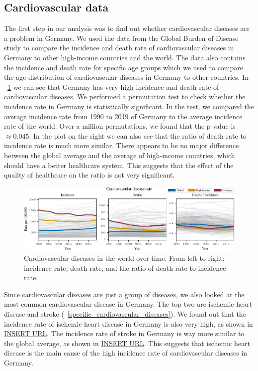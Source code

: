 \subsection{Cardiovascular data}\label{sec:cardiovascular_data}
The first step in our analysis was to find out whether cardiovascular diseases are a problem in Germany. We used the data from the Global Burden of Disease study \citep{GBD2019}
to compare the incidence and death rate of cardiovascular diseases in Germany to other high-income countries and the world. The data also contains 
the incidence and death rate for specific age groups which we used to compare the age distribution of cardiovascular diseases in Germany to other countries.
In \figurename~\ref{Cardiovascular diseases over time} we can see that Germany has very high incidence and death rate of cardiovascular diseases. We performed a
permutation test to check whether the incidence rate in Germany is statistically significant. In the test, we compared the average incidence rate from 1990 to 2019
of Germany to the average incidence rate of the world. Over a million permutations, we found that the p-value is $\approx 0.045$. 
In the plot on the right we can also see that the ratio of death rate to incidence rate is much more similar. There appears to be no major difference between the global average and the average of 
high-income countries, which should have a better healthcare system. This suggests that the effect of the quality of healthcare on the ratio is not very significant.

\begin{figure}[h]
    \vskip 0.2in
    \centering
    \centerline{\includegraphics[]{fig/fig_cardiovascular_disease_rate.pdf}}
    \caption{Cardiovascular diseases in the world over time. From left to right: incidence rate, death rate, 
    and the ratio of death rate to incidence rate.}
    \label{Cardiovascular diseases over time}
\end{figure}

Since cardiovascular diseases are just a group of diseases, we also looked at the most common cardiovascular disease in Germany. The top two are ischemic heart disease and 
stroke (\figurename~\ref{specific_cardiovascular_diseases}). We found out that the incidence rate of ischemic heart disease in Germany is also very high, as shown in \url{INSERT URL}. The incidence rate of stroke in Germany
is way more similar to the global average, as shown in \url{INSERT URL}. This suggests that ischemic heart disease is the main cause of the high incidence rate of 
cardiovascular diseases in Germany.

